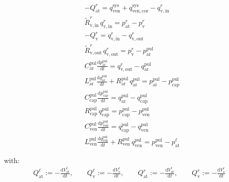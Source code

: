 \documentclass[a4paper,12pt]{report}
\begin{document}
\begin{align}
&-Q_{\mathrm{at}}^{r} = q_{\mathrm{ven}}^{\mathrm{sys}} + q_{\mathrm{ven,cor}}^{\mathrm{sys}} - q_{\mathrm{v,in}}^{r}\nonumber\\
&\tilde{R}_{\mathrm{v,in}}^{r}\,q_{\mathrm{v,in}}^{r} = p_{\mathrm{at}}^{r}-p_{\mathrm{v}}^{r}\nonumber\\
&-Q_{\mathrm{v}}^{r} = q_{\mathrm{v,in}}^{r} - q_{\mathrm{v,out}}^{r}\nonumber\\
&\tilde{R}_{\mathrm{v,out}}^{r}\,q_{\mathrm{v,out}}^{r} = p_{\mathrm{v}}^{r}-p_{\mathrm{ar}}^{\mathrm{pul}}\nonumber\\
&C_{\mathrm{ar}}^{\mathrm{pul}} \frac{\mathrm{d}p_{\mathrm{ar}}^{\mathrm{pul}}}{\mathrm{d}t} = q_{\mathrm{v,out}}^{r} - q_{\mathrm{ar}}^{\mathrm{pul}}\nonumber\\
&L_{\mathrm{ar}}^{\mathrm{pul}}\frac{\mathrm{d}q_{\mathrm{ar}}^{\mathrm{pul}}}{\mathrm{d}t} + R_{\mathrm{ar}}^{\mathrm{pul}}\,q_{\mathrm{ar}}^{\mathrm{pul}}=p_{\mathrm{ar}}^{\mathrm{pul}} -p_{\mathrm{cap}}^{\mathrm{pul}}\nonumber\\
&C_{\mathrm{cap}}^{\mathrm{pul}} \frac{\mathrm{d}p_{\mathrm{cap}}^{\mathrm{pul}}}{\mathrm{d}t} = q_{\mathrm{ar}}^{\mathrm{pul}} - q_{\mathrm{cap}}^{\mathrm{pul}}\nonumber\\
&R_{\mathrm{cap}}^{\mathrm{pul}}\,q_{\mathrm{cap}}^{\mathrm{pul}}=p_{\mathrm{cap}}^{\mathrm{pul}}-p_{\mathrm{ven}}^{\mathrm{pul}}\nonumber\\
&C_{\mathrm{ven}}^{\mathrm{pul}} \frac{\mathrm{d}p_{\mathrm{ven}}^{\mathrm{pul}}}{\mathrm{d}t} = q_{\mathrm{cap}}^{\mathrm{pul}} - q_{\mathrm{ven}}^{\mathrm{pul}}\nonumber\\
&L_{\mathrm{ven}}^{\mathrm{pul}}\frac{\mathrm{d}q_{\mathrm{ven}}^{\mathrm{pul}}}{\mathrm{d}t} + R_{\mathrm{ven}}^{\mathrm{pul}}\, q_{\mathrm{ven}}^{\mathrm{pul}}=p_{\mathrm{ven}}^{\mathrm{pul}}-p_{\mathrm{at}}^{\ell}\nonumber
\end{align}

with:
\begin{align}
Q_{\mathrm{at}}^{\ell} := -\frac{\mathrm{d}V_{\mathrm{at}}^{\ell}}{\mathrm{d}t}, \qquad
Q_{\mathrm{v}}^{\ell} := -\frac{\mathrm{d}V_{\mathrm{v}}^{\ell}}{\mathrm{d}t}, \qquad
Q_{\mathrm{at}}^{r} := -\frac{\mathrm{d}V_{\mathrm{at}}^{r}}{\mathrm{d}t}, \qquad
Q_{\mathrm{v}}^{r} := -\frac{\mathrm{d}V_{\mathrm{v}}^{r}}{\mathrm{d}t} \nonumber
\end{align}


\end{document}
